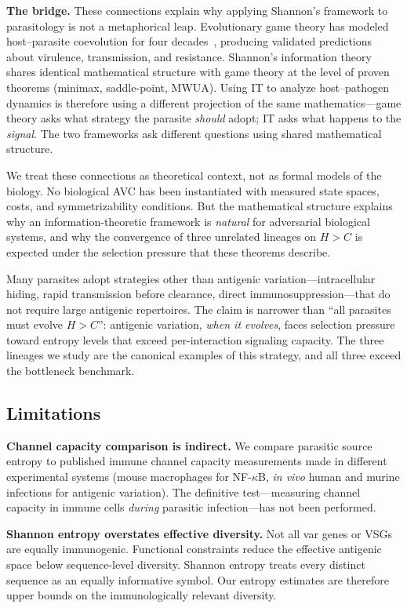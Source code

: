 \documentclass[twocolumn,10pt]{article}
\begin{document}
\textbf{The bridge.}  These connections explain why applying Shannon's framework to parasitology is not a metaphorical leap.  Evolutionary game theory has modeled host--parasite coevolution for four decades~\citep{bremermann1983,nowak1994,frank1996}, producing validated predictions about virulence, transmission, and resistance.  Shannon's information theory shares identical mathematical structure with game theory at the level of proven theorems (minimax, saddle-point, MWUA).  Using IT to analyze host--pathogen dynamics is therefore using a different projection of the same mathematics---game theory asks what strategy the parasite \emph{should} adopt; IT asks what happens to the \emph{signal}.  The two frameworks ask different questions using shared mathematical structure.

We treat these connections as theoretical context, not as formal models of the biology.  No biological AVC has been instantiated with measured state spaces, costs, and symmetrizability conditions.  But the mathematical structure explains why an information-theoretic framework is \emph{natural} for adversarial biological systems, and why the convergence of three unrelated lineages on $H > C$ is expected under the selection pressure that these theorems describe.

Many parasites adopt strategies other than antigenic variation---intracellular hiding, rapid transmission before clearance, direct immunosuppression---that do not require large antigenic repertoires.  The claim is narrower than ``all parasites must evolve $H > C$'': antigenic variation, \emph{when it evolves}, faces selection pressure toward entropy levels that exceed per-interaction signaling capacity.  The three lineages we study are the canonical examples of this strategy, and all three exceed the bottleneck benchmark.

\subsection{Limitations}

\textbf{Channel capacity comparison is indirect.}  We compare parasitic source entropy to published immune channel capacity measurements made in different experimental systems (mouse macrophages for NF-$\kappa$B, \emph{in vivo} human and murine infections for antigenic variation).  The definitive test---measuring channel capacity in immune cells \emph{during} parasitic infection---has not been performed.

\textbf{Shannon entropy overstates effective diversity.}  Not all var genes or VSGs are equally immunogenic.  Functional constraints reduce the effective antigenic space below sequence-level diversity.  Shannon entropy treats every distinct sequence as an equally informative symbol.  Our entropy estimates are therefore upper bounds on the immunologically relevant diversity.
\end{document}
